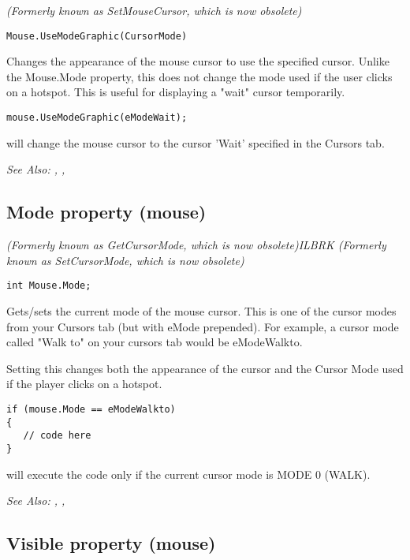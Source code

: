 \it{(Formerly known as SetMouseCursor, which is now obsolete)}

\begin{verbatim}
Mouse.UseModeGraphic(CursorMode)
\end{verbatim}
Changes the appearance of the mouse cursor to use the specified cursor. Unlike
the Mouse.Mode property, this does not change the mode used if the user
clicks on a hotspot. This is useful for displaying a "wait" cursor temporarily.

\begin{verbatim}
mouse.UseModeGraphic(eModeWait);
\end{verbatim}
will change the mouse cursor to the cursor 'Wait' specified in the Cursors tab.

\it{See Also:} ,
, 


\subsection{Mode property (mouse)}\label{Mouse.Mode}%

\it{(Formerly known as GetCursorMode, which is now obsolete)}ILBRK
\it{(Formerly known as SetCursorMode, which is now obsolete)}

\begin{verbatim}
int Mouse.Mode;
\end{verbatim}
Gets/sets the current mode of the mouse cursor. This is one of the cursor modes
from your Cursors tab (but with eMode prepended). For example, a cursor mode called "Walk to"
on your cursors tab would be  eModeWalkto.

Setting this changes both the appearance of the cursor and the Cursor Mode
used if the player clicks on a hotspot.

\begin{verbatim}
if (mouse.Mode == eModeWalkto)
{
   // code here
}
\end{verbatim}
will execute the code only if the current cursor mode is MODE 0 (WALK).

\it{See Also:} ,
, 


\subsection{Visible property (mouse)}\label{Mouse.Visible}%

